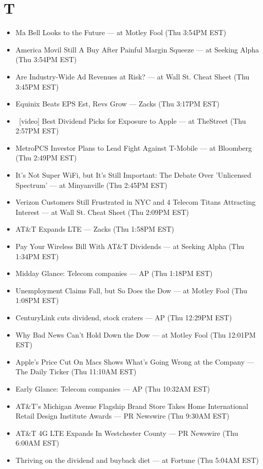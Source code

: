 \documentclass[11pt,asymmetric]{article}
\begin{document}
\section*{T}
\begin{itemize}
\item Ma Bell Looks to the Future --- at Motley Fool (Thu 3:54PM EST)
\item America Movil Still A Buy After Painful Margin Squeeze --- at Seeking Alpha (Thu 3:54PM EST)
\item Are Industry-Wide Ad Revenues at Risk? --- at Wall St. Cheat Sheet (Thu 3:45PM EST)
\item Equinix Beats EPS Est, Revs Grow --- Zacks (Thu 3:17PM EST)
\item\ [video] Best Dividend Picks for Exposure to Apple --- at TheStreet (Thu 2:57PM EST)
\item MetroPCS Investor Plans to Lead Fight Against T-Mobile --- at Bloomberg (Thu 2:49PM EST)
\item It's Not Super WiFi, but It's Still Important: The Debate Over 'Unlicensed Spectrum' --- at Minyanville (Thu 2:45PM EST)
\item Verizon Customers Still Frustrated in NYC and 4 Telecom Titans Attracting Interest --- at Wall St. Cheat Sheet (Thu 2:09PM EST)
\item AT\&T Expands LTE --- Zacks (Thu 1:58PM EST)
\item Pay Your Wireless Bill With AT\&T Dividends --- at Seeking Alpha (Thu 1:34PM EST)
\item Midday Glance: Telecom companies --- AP (Thu 1:18PM EST)
\item Unemployment Claims Fall, but So Does the Dow --- at Motley Fool (Thu 1:08PM EST)
\item CenturyLink cuts dividend, stock craters --- AP (Thu 12:29PM EST)
\item Why Bad News Can't Hold Down the Dow --- at Motley Fool (Thu 12:01PM EST)
\item Apple’s Price Cut On Macs Shows What’s Going Wrong at the Company --- The Daily Ticker (Thu 11:10AM EST)
\item Early Glance: Telecom companies --- AP (Thu 10:32AM EST)
\item AT\&T's Michigan Avenue Flagship Brand Store Takes Home International Retail Design Institute Awards --- PR Newswire (Thu 9:30AM EST)
\item AT\&T 4G LTE Expands In Westchester County --- PR Newswire (Thu 6:00AM EST)
\item Thriving on the dividend and buyback diet --- at Fortune (Thu 5:04AM EST)

\end{itemize}
\end{document}
